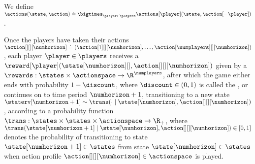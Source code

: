 We define $\actions (\state, \action) \doteq \bigtimes_{\player \in \players} \actions[\player] (\state, \action[-\player])$. 
% 

Once the players have taken their actions $\action[][][\numhorizon] \doteq (\action[1][][\numhorizon], \hdots, \action[\numplayers][][\numhorizon])$, each player $\player \in \players$ receives a  $\reward[\player](\state[\numhorizon][], \action[][][\numhorizon])$ given by a  $\rewards: \states \times \actionspace \to \R^\numplayers$, after which the game either ends with probability $1-\discount$, where $\discount \in (0,1)$ is called the ,
or continues on to time period $\numhorizon + 1$, transitioning to a new state $\staterv[\numhorizon + 1] \sim \trans (\cdot \mid \state[\numhorizon], \action[][][\numhorizon])$, according to a  probability function $\trans: \states \times \states \times \actionspace \to \R_+$, where $\trans (\state[\numhorizon + 1] \mid \state[\numhorizon], \action[][][\numhorizon]) \in [0,1]$ denotes the probability of transitioning to state $\state[\numhorizon + 1] \in \states$ from state $\state[\numhorizon] \in \states$ when action profile $\action[][][\numhorizon] \in \actionspace$ is played. 

